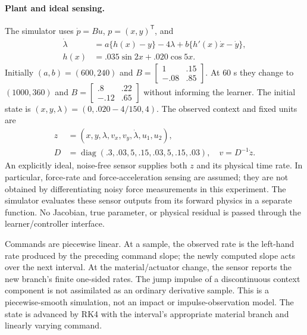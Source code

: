 \documentclass[journal]{IEEEtran}
\begin{document}
\paragraph{Plant and ideal sensing.}
The simulator uses $\dot p=Bu$, $p=(x,y)^{\mathsf T}$, and
\begin{align}
 \dot\lambda&=a\{h(x)-y\}-4\lambda+b\{h'(x)\dot x-\dot y\},\nonumber\\
 h(x)&=.035\sin2x+.020\cos5x.
 \label{eq:direct_contact_plant}
\end{align}
Initially $(a,b)=(600,240)$ and
$B=\left[\begin{smallmatrix}1&.15\\-.08&.85\end{smallmatrix}\right]$.
At $60$ s they change to $(1000,360)$ and
$B=\left[\begin{smallmatrix}.8&.22\\-.12&.65\end{smallmatrix}\right]$
without informing the learner. The initial state is
$(x,y,\lambda)=(0,.020-4/150,4)$.
The observed context and fixed units are
\begin{align}
 z&=(x,y,\lambda,v_x,v_y,\dot\lambda,u_1,u_2),\nonumber\\
 D&=\operatorname{diag}(.3,.03,5,.15,.03,5,.15,.03),\quad
 v=D^{-1}\dot z.\label{eq:direct_contact_units}
\end{align}
An explicitly ideal, noise-free sensor supplies both $z$ and its physical time
rate. In particular, force-rate and force-acceleration sensing are assumed;
they are not obtained by differentiating noisy force measurements in this
experiment. The simulator evaluates these sensor outputs from its forward
physics in a separate function. No Jacobian, true parameter, or physical
residual is passed through the learner/controller interface.

Commands are piecewise linear. At a sample, the observed rate is the left-hand
rate produced by the preceding command slope; the newly computed slope acts
over the next interval. At the material/actuator change, the sensor reports
the new branch's finite one-sided rates. The jump impulse of a discontinuous
context component is not assimilated as an ordinary derivative sample.
This is a piecewise-smooth simulation, not an impact or impulse-observation
model. The state is advanced by RK4 with the interval's appropriate material
branch and linearly varying command.
\end{document}

